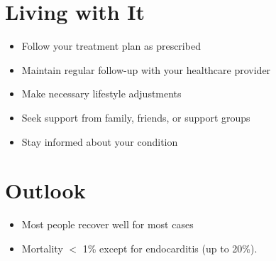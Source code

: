 \section{Living with It}
\begin{itemize}[noitemsep]
  \item Follow your treatment plan as prescribed
  \item Maintain regular follow-up with your healthcare provider
  \item Make necessary lifestyle adjustments
  \item Seek support from family, friends, or support groups
  \item Stay informed about your condition
\end{itemize}
\section{Outlook}
\begin{itemize}[noitemsep]
  \item Most people recover well for most cases
  \item Mortality $<$ 1\% except for endocarditis (up to 20\%).
\end{itemize}
